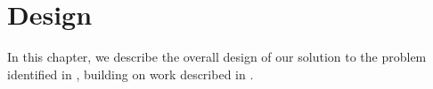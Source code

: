 \chapter{Design}
\label{ch:design}

In this chapter, we describe the overall design of our solution to the problem identified in , building on work described in .

